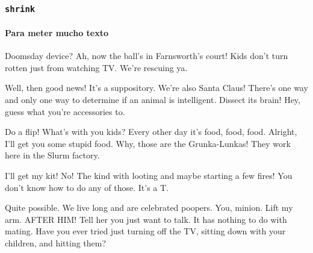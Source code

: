 \begin{frame}[shrink]

\frametitle{\texttt{shrink}}
\framesubtitle{Para meter mucho texto}


Doomsday device? Ah, now the ball's in Farnsworth's court! Kids don't turn rotten just from watching TV. We're rescuing ya.

Well, then good news! It's a suppository. We're also Santa Claus! There's one way and only one way to determine if an animal is intelligent. Dissect its brain! Hey, guess what you're accessories to.

Do a flip! What's with you kids? Every other day it's food, food, food. Alright, I'll get you some stupid food. Why, those are the Grunka-Lunkas! They work here in the Slurm factory.

I'll get my kit! No! The kind with looting and maybe starting a few fires! You don't know how to do any of those. It's a T.

Quite possible. We live long and are celebrated poopers. You, minion. Lift my arm. AFTER HIM! Tell her you just want to talk. It has nothing to do with mating. Have you ever tried just turning off the TV, sitting down with your children, and hitting them?

\end{frame}
